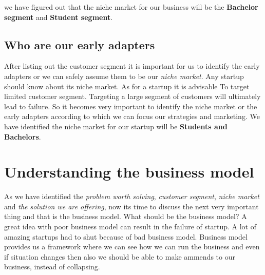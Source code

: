 \documentclass[a4paper, 12pt]{report}
\begin{document}
we have figured out that the niche market for our business will be the \textbf{Bachelor segment} and \textbf{Student segment}.
\subsection{Who are our early adapters}
After listing out the customer segment it is important for us to identify the early adapters or we can safely assume them
to be our \textit{niche market}. Any startup should know about its niche market. As for a startup it is advisable To
target limited customer segment. Targeting a large segment of customers will ultimately lead to failure. So it becomes
very important to identify the niche market or the early adapters according to which we can focus our strategies and
marketing. We have identified the niche market for our startup will be \textbf{Students and Bachelors}.

\section*{Understanding the business model}
As we have identified the \textit{problem worth solving}, \textit{customer segment}, \textit{niche market} and
\textit{the solution we are offering}, now its time to discuss the next very important thing and that is the business 
model. What should be the business model? A great idea with poor business model can result in the failure of 
startup. A lot of amazing startups had to shut because of bad business model. Business model provides us a framework
where we can see how we can run the business and even if situation changes then also we should be able to make
ammends to our business, instead of collapsing.
\end{document}
